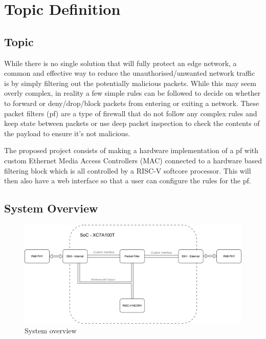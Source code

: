 \chapter[Topic Definition]{Topic Definition}
\label{Chap:label}	%
\pagestyle{headings}


\section{Topic}

While there is no single solution that will fully protect an edge network, a common and effective way to reduce the unauthorised/unwanted network 
traffic is by simply filtering out the potentially malicious packets. While this may seem overly complex, in reality a few simple rules can be followed
to decide on whether to forward or deny/drop/block packets from entering or exiting a network. These packet filters (pf) are a type of firewall that do 
not follow any complex rules and keep state between packets or use deep packet inspection to check the contents of the payload to ensure it's not 
malicious. 

The proposed project consists of making a hardware implementation of a pf with custom Ethernet Media Access Controllers (MAC) connected to a hardware
based filtering block which is all controlled by a RISC-V softcore processor. This will then also have a web interface so that a user can configure
the rules for the pf.

\section{System Overview}


\begin{figure}[h]
    \centering
    \includegraphics[width=1\textwidth]{Images/ThesisSystemsOverview.png}
    \caption{System overview}
    \label{fig:sys-overview}
\end{figure}




